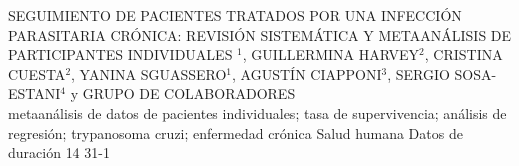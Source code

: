 \A
{SEGUIMIENTO DE PACIENTES TRATADOS POR UNA INFECCIÓN PARASITARIA CRÓNICA: REVISIÓN SISTEMÁTICA Y METAANÁLISIS DE PARTICIPANTES INDIVIDUALES}
{$^1$, GUILLERMINA HARVEY$^2$, CRISTINA CUESTA$^2$, YANINA SGUASSERO$^1$, AGUSTÍN CIAPPONI$^3$, SERGIO SOSA-ESTANI$^4$ y GRUPO DE COLABORADORES}
{
\\}
{metaanálisis de datos de pacientes individuales; tasa de supervivencia; análisis de regresión; trypanosoma cruzi; enfermedad crónica} 
 {Salud humana} 
 {Datos de duración} 
 {14} 
 {31-1}
